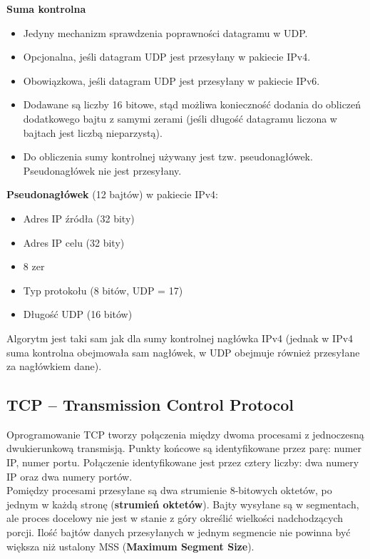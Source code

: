 \documentclass[../main.tex]{subfiles}
\begin{document}
    \textbf{Suma kontrolna}\\
    \begin{itemize}
        \item Jedyny mechanizm sprawdzenia poprawności datagramu w UDP.
        \item Opcjonalna, jeśli datagram UDP jest przesyłany w pakiecie IPv4.
        \item Obowiązkowa, jeśli datagram UDP jest przesyłany w pakiecie IPv6.
        \item Dodawane są liczby 16 bitowe, stąd możliwa konieczność dodania do obliczeń
        dodatkowego bajtu z samymi zerami (jeśli długość datagramu liczona w bajtach jest liczbą
        nieparzystą).
        \item Do obliczenia sumy kontrolnej używany jest tzw. pseudonagłówek. Pseudonagłówek nie jest przesyłany.
    \end{itemize}

    \textbf{Pseudonagłówek} (12 bajtów) w pakiecie IPv4:
    \begin{itemize}
        \item Adres IP źródła (32 bity)
        \item Adres IP celu (32 bity)
        \item 8 zer
        \item Typ protokołu (8 bitów, UDP = 17)
        \item Długość UDP (16 bitów)
    \end{itemize}
    Algorytm jest taki sam jak dla sumy kontrolnej nagłówka IPv4 (jednak w IPv4 suma kontrolna
    obejmowała sam nagłówek, w UDP obejmuje również przesyłane za nagłówkiem dane).

    \subsection{TCP – Transmission Control Protocol}
    Oprogramowanie TCP tworzy połączenia między dwoma procesami z
    jednoczesną dwukierunkową transmisją. Punkty końcowe są identyfikowane przez parę: numer IP, numer
    portu. Połączenie identyfikowane jest przez cztery liczby: dwa numery IP oraz dwa
    numery portów.\\
    Pomiędzy procesami przesyłane są dwa strumienie 8-bitowych oktetów, po jednym
    w każdą stronę (\textbf{strumień oktetów}). Bajty wysyłane są w
    segmentach, ale proces docelowy nie jest w stanie z góry określić
    wielkości nadchodzących porcji. Ilość bajtów danych przesyłanych w jednym segmencie nie powinna być większa niż ustalony MSS (\textbf{Maximum Segment Size}).\\
\end{document}
